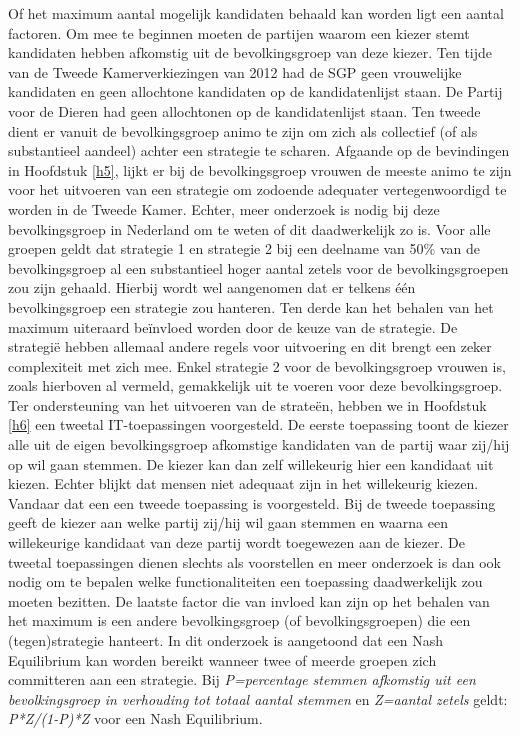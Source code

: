 Of het maximum aantal mogelijk kandidaten behaald kan worden ligt een aantal factoren. Om mee te beginnen moeten de partijen waarom een kiezer stemt kandidaten hebben afkomstig uit de bevolkingsgroep van deze kiezer. Ten tijde van de Tweede Kamerverkiezingen van 2012 had de SGP geen vrouwelijke kandidaten en geen allochtone kandidaten op de kandidatenlijst staan. De Partij voor de Dieren had geen allochtonen op de kandidatenlijst staan. Ten tweede dient er vanuit de bevolkingsgroep animo te zijn om zich als collectief (of als substantieel aandeel) achter een strategie te scharen. Afgaande op de bevindingen in Hoofdstuk \ref{h5}, lijkt er bij de bevolkingsgroep vrouwen de meeste animo te zijn voor het uitvoeren van een strategie om zodoende adequater vertegenwoordigd te worden in de Tweede Kamer. Echter, meer onderzoek is nodig bij deze bevolkingsgroep in Nederland om te weten of dit daadwerkelijk zo is. Voor alle groepen geldt dat strategie 1 en strategie 2 bij een deelname van 50\% van de bevolkingsgroep al een substantieel hoger aantal zetels voor de bevolkingsgroepen zou zijn gehaald. Hierbij wordt wel aangenomen dat er telkens één bevolkingsgroep een strategie zou hanteren. Ten derde kan het behalen van het maximum uiteraard be\"{i}nvloed worden door de keuze van de strategie. De strategi\"{e} hebben allemaal andere regels voor uitvoering en dit brengt een zeker complexiteit met zich mee. Enkel strategie 2 voor de bevolkingsgroep vrouwen is, zoals hierboven al vermeld, gemakkelijk uit te voeren voor deze bevolkingsgroep.  Ter ondersteuning van het uitvoeren van de strate\"{e}n, hebben we in Hoofdstuk \ref{h6} een tweetal IT-toepassingen voorgesteld. De eerste toepassing toont de kiezer alle uit de eigen bevolkingsgroep afkomstige kandidaten van de partij waar zij/hij op wil gaan stemmen. De kiezer kan dan zelf willekeurig hier een kandidaat uit kiezen. Echter blijkt dat mensen niet adequaat zijn in het willekeurig kiezen. Vandaar dat een een tweede toepassing is voorgesteld. Bij de tweede toepassing geeft de kiezer aan welke partij zij/hij wil gaan stemmen en waarna een willekeurige kandidaat van deze partij wordt toegewezen aan de kiezer.  De tweetal toepassingen dienen slechts als voorstellen en meer onderzoek is dan ook nodig om te bepalen welke functionaliteiten een toepassing daadwerkelijk zou moeten bezitten. De laatste factor die van invloed kan zijn op het behalen van het maximum is een andere bevolkingsgroep (of bevolkingsgroepen) die een (tegen)strategie hanteert. In dit onderzoek is aangetoond dat een Nash Equilibrium kan worden bereikt wanneer twee of meerde groepen zich committeren aan een strategie. Bij \textit{P=percentage stemmen afkomstig uit een bevolkingsgroep in verhouding tot totaal aantal stemmen} en \textit{Z=aantal zetels} geldt: \textit{P*Z/(1-P)*Z} voor een Nash Equilibrium.

